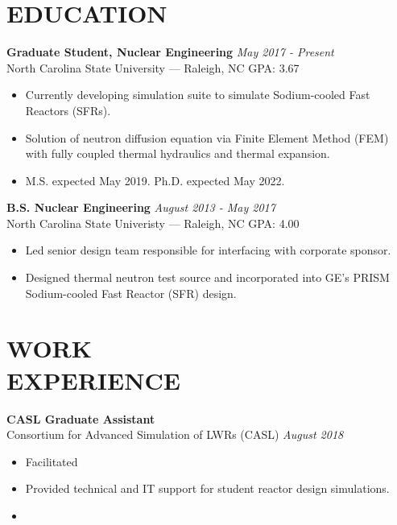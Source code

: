\documentclass[margin, 10pt]{res} %
\newcommand{\backwardspace}{-8pt}
\begin{document}
\begin{resume}


\vspace{-12pt}
 
\section{EDUCATION}  
\textbf{Graduate Student, Nuclear Engineering} \hfill \textit{May 2017 - Present}\\
North Carolina State University --- Raleigh, NC \hfill GPA: 3.67
\begin{itemize}
    \item Currently developing simulation suite to simulate Sodium-cooled Fast Reactors (SFRs).
    \item Solution of neutron diffusion equation via Finite Element Method (FEM) with fully coupled thermal hydraulics and thermal expansion.
    \item M.S. expected May 2019. Ph.D. expected May 2022.
\end{itemize}
\vspace{\backwardspace}
\textbf{B.S. Nuclear Engineering} \hfill \textit{August 2013 - May 2017} \\
North Carolina State Univeristy --- Raleigh, NC \hfill GPA: 4.00
\begin{itemize}
    \item Led senior design team responsible for interfacing with corporate sponsor.
    \item Designed thermal neutron test source and incorporated into GE's PRISM Sodium-cooled Fast Reactor (SFR) design.
\end{itemize}

 
\section{WORK \\ EXPERIENCE}

\textbf{CASL Graduate Assistant}\\
Consortium for Advanced Simulation of LWRs (CASL) \hfill \textit{August 2018}
\begin{itemize}
    \item Facilitated 
    \item Provided technical and IT support for student reactor design simulations.
    \item 
\end{itemize}


\end{resume}
\end{document}
